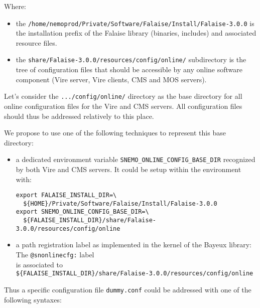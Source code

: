 \noindent Where:
\begin{itemize}
\item                                                              the
  \verb|/home/nemoprod/Private/Software/Falaise/Install/Falaise-3.0.0|
  is  the  installation  prefix  of  the  Falaise  library  (binaries,
  includes) and associated resource files.
\item      the     \verb|share/Falaise-3.0.0/resources/config/online/|
  subdirectory  is the  tree  of configuration  files  that should  be
  accessible  by  any online  software  component  (Vire server,  Vire
  clients, CMS and MOS servers).
\end{itemize}


\noindent  Let's consider  the \verb|.../config/online/|  directory as
the base directory for all online configuration files for the Vire and
CMS  servers.   All  configuration  files  should  thus  be  addressed
relatively to this place.

\noindent  We  propose to  use  one  of  the following  techniques  to
represent this base directory:

\begin{itemize}
\item         a         dedicated         environment         variable
  \verb|SNEMO_ONLINE_CONFIG_BASE_DIR| recognized by  both Vire and CMS
  servers. It could be setup within the environment with:
\vskip 20pt
\small
\begin{Verbatim}[frame=single,xleftmargin=0.cm,label=\fbox{shell}]
export FALAISE_INSTALL_DIR=\
  ${HOME}/Private/Software/Falaise/Install/Falaise-3.0.0
export SNEMO_ONLINE_CONFIG_BASE_DIR=\
  ${FALAISE_INSTALL_DIR}/share/Falaise-3.0.0/resources/config/online
\end{Verbatim}
\normalsize

\item a  path registration label as  implemented in the kernel  of the
  Bayeux library:\\
  \noindent The \verb|@snonlinecfg:| label \\
  is associated to\\
  \noindent \hskip 50pt\verb|${FALAISE_INSTALL_DIR}/share/Falaise-3.0.0/resources/config/online|

\end{itemize}

\noindent Thus a specific  configuration file \verb|dummy.conf| could be
addressed with one of the following syntaxes:

